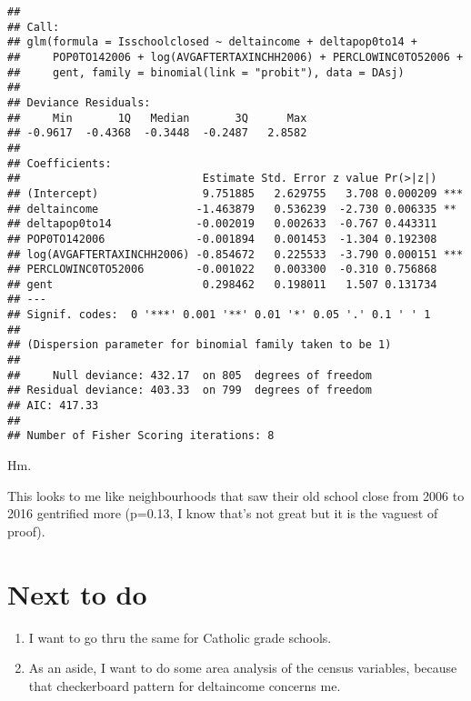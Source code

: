 \documentclass[]{article}
\begin{document}
\begin{verbatim}
## 
## Call:
## glm(formula = Isschoolclosed ~ deltaincome + deltapop0to14 + 
##     POP0TO142006 + log(AVGAFTERTAXINCHH2006) + PERCLOWINC0TO52006 + 
##     gent, family = binomial(link = "probit"), data = DAsj)
## 
## Deviance Residuals: 
##     Min       1Q   Median       3Q      Max  
## -0.9617  -0.4368  -0.3448  -0.2487   2.8582  
## 
## Coefficients:
##                            Estimate Std. Error z value Pr(>|z|)    
## (Intercept)                9.751885   2.629755   3.708 0.000209 ***
## deltaincome               -1.463879   0.536239  -2.730 0.006335 ** 
## deltapop0to14             -0.002019   0.002633  -0.767 0.443311    
## POP0TO142006              -0.001894   0.001453  -1.304 0.192308    
## log(AVGAFTERTAXINCHH2006) -0.854672   0.225533  -3.790 0.000151 ***
## PERCLOWINC0TO52006        -0.001022   0.003300  -0.310 0.756868    
## gent                       0.298462   0.198011   1.507 0.131734    
## ---
## Signif. codes:  0 '***' 0.001 '**' 0.01 '*' 0.05 '.' 0.1 ' ' 1
## 
## (Dispersion parameter for binomial family taken to be 1)
## 
##     Null deviance: 432.17  on 805  degrees of freedom
## Residual deviance: 403.33  on 799  degrees of freedom
## AIC: 417.33
## 
## Number of Fisher Scoring iterations: 8
\end{verbatim}

Hm.

This looks to me like neighbourhoods that saw their old school close
from 2006 to 2016 gentrified more (p=0.13, I know that's not great but
it is the vaguest of proof).

\hypertarget{next-to-do}{%
\section{Next to do}\label{next-to-do}}

\begin{enumerate}
\def\labelenumi{\arabic{enumi}.}
\item
  I want to go thru the same for Catholic grade schools.
\item
  As an aside, I want to do some area analysis of the census variables,
  because that checkerboard pattern for deltaincome concerns me.
\end{enumerate}
\end{document}
